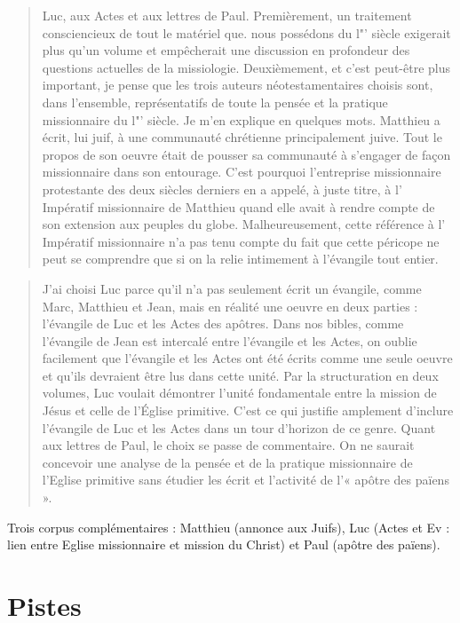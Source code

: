 \begin{quote}
Luc, aux Actes et aux lettres de Paul. Premièrement, un traitement
consciencieux de tout le matériel que. nous possédons du l"' siècle
exigerait plus qu'un volume et empêcherait une discussion en
profondeur des questions actuelles de la missiologie. Deuxièmement,
et c'est peut-être plus important, je pense que les trois auteurs
néotestamentaires choisis sont, dans l'ensemble, représentatifs de toute
la pensée et la pratique missionnaire du l"' siècle. Je m'en explique en
quelques mots.
Matthieu a écrit, lui juif, à une communauté chrétienne
principalement juive. Tout le propos de son oeuvre était de pousser sa
communauté à s'engager de façon missionnaire dans son entourage.
C'est pourquoi l'entreprise missionnaire protestante des deux siècles
derniers en a appelé, à juste titre, à l' Impératif missionnaire de
Matthieu quand elle avait à rendre compte de son extension aux
peuples du globe. Malheureusement, cette référence à l' Impératif
missionnaire n'a pas tenu compte du fait que cette péricope ne peut se
comprendre que si on la relie intimement à l'évangile tout entier.
\end{quote}

\begin{quote}
J'ai choisi Luc parce qu'il n'a pas seulement écrit un évangile,
comme Marc, Matthieu et Jean, mais en réalité une oeuvre en deux
parties : l'évangile de Luc et les Actes des apôtres. Dans nos bibles,
comme l'évangile de Jean est intercalé entre l'évangile et les Actes, on
oublie facilement que l'évangile et les Actes ont été écrits comme une seule oeuvre et qu'ils devraient être lus dans cette unité. Par la  structuration en deux volumes, Luc voulait démontrer l'unité
fondamentale entre la mission de Jésus et celle de l'Église primitive. C'est ce qui justifie amplement d'inclure l'évangile de Luc et les Actes dans un tour d'horizon de ce genre. 
Quant aux lettres de Paul, le choix se passe de commentaire. On ne saurait concevoir une analyse de la pensée et de la pratique missionnaire de l'Eglise primitive sans étudier les écrit et l'activité de 
l'« apôtre des païens ».
\end{quote}

Trois corpus complémentaires : Matthieu (annonce aux Juifs), Luc (Actes et Ev : lien entre Eglise missionnaire et mission du Christ) et Paul (apôtre des païens).


\section{Pistes}

